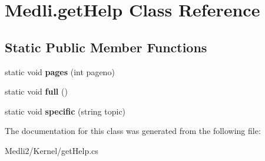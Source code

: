 \hypertarget{class_medli_1_1get_help}{}\section{Medli.\+get\+Help Class Reference}
\label{class_medli_1_1get_help}
\subsection*{Static Public Member Functions}
\begin{DoxyCompactItemize}
\item 
\mbox{\label{class_medli_1_1get_help_a383a3e0e35749337aacd4dbe0715a5a4}} 
static void {\bfseries pages} (int pageno)
\item 
\mbox{\label{class_medli_1_1get_help_a2011bb84c9c5d7943f156598cddfaa2e}} 
static void {\bfseries full} ()
\item 
\mbox{\label{class_medli_1_1get_help_a571fc393f19298f818f67335730b7212}} 
static void {\bfseries specific} (string topic)
\end{DoxyCompactItemize}


The documentation for this class was generated from the following file\+:\begin{DoxyCompactItemize}
\item 
Medli2/\+Kernel/get\+Help.\+cs\end{DoxyCompactItemize}
